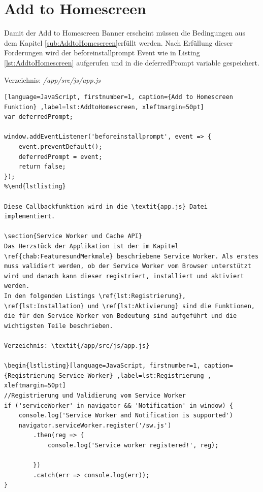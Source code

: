 \section{Add to Homescreen}
Damit der Add to Homescreen Banner erscheint müssen die Bedingungen aus dem Kapitel \ref{sub:AddtoHomescreen}erfüllt werden.
Nach Erfüllung dieser Forderungen wird der beforeinstallprompt Event wie in Listing \ref{lst:AddtoHomescreen} aufgerufen und in die deferredPrompt variable gespeichert.

Verzeichnis: \textit{/app/src/js/app.js}

\begin{lstlisting}[language=JavaScript, firstnumber=1, caption={Add to Homescreen Funktion} ,label=lst:AddtoHomescreen, xleftmargin=50pt]
var deferredPrompt;

window.addEventListener('beforeinstallprompt', event => {
    event.preventDefault();
    deferredPrompt = event;
    return false;
});
%\end{lstlisting}

Diese Callbackfunktion wird in die \textit{app.js} Datei implementiert. 

\section{Service Worker und Cache API}
Das Herzstück der Applikation ist der im Kapitel \ref{chab:FeaturesundMerkmale} beschriebene Service Worker. Als erstes muss validiert werden, ob der Service Worker vom Browser unterstützt wird und danach kann dieser registriert, installiert und aktiviert werden.
In den folgenden Listings \ref{lst:Registrierung}, \ref{lst:Installation} und \ref{lst:Aktivierung} sind die Funktionen, die für den Service Worker von Bedeutung sind aufgeführt und die wichtigsten Teile beschrieben.

Verzeichnis: \textit{/app/src/js/app.js}

\begin{lstlisting}[language=JavaScript, firstnumber=1, caption={Registrierung Service Worker} ,label=lst:Registrierung , xleftmargin=50pt]
//Registrierung und Validierung vom Service Worker
if ('serviceWorker' in navigator && 'Notification' in window) {
    console.log('Service Worker and Notification is supported')
    navigator.serviceWorker.register('/sw.js')
        .then(reg => {
            console.log('Service worker registered!', reg);

        })
        .catch(err => console.log(err));
}
\end{lstlisting}

